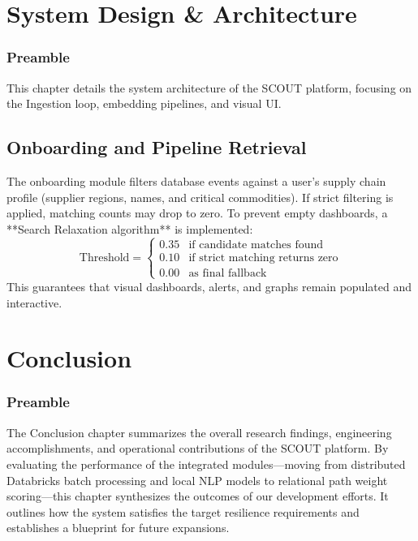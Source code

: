 \documentclass[12pt]{report}
\begin{document}
\newpage
\chapter{System Design \& Architecture}
\thispagestyle{fancy}

\subsection{Preamble}
This chapter details the system architecture of the SCOUT platform, focusing on the Ingestion loop, embedding pipelines, and visual UI.

\section{Onboarding and Pipeline Retrieval}
The onboarding module filters database events against a user's supply chain profile (supplier regions, names, and critical commodities). If strict filtering is applied, matching counts may drop to zero. To prevent empty dashboards, a **Search Relaxation algorithm** is implemented:
\begin{equation}
  \text{Threshold} = 
  \begin{cases} 
    0.35 & \text{if candidate matches found} \\
    0.10 & \text{if strict matching returns zero} \\
    0.00 & \text{as final fallback}
  \end{cases}
\end{equation}
This guarantees that visual dashboards, alerts, and graphs remain populated and interactive.

\newpage
\chapter{Conclusion}
\thispagestyle{fancy}

\subsection{Preamble}
The Conclusion chapter summarizes the overall research findings, engineering accomplishments, and operational contributions of the SCOUT platform. By evaluating the performance of the integrated modules—moving from distributed Databricks batch processing and local NLP models to relational path weight scoring—this chapter synthesizes the outcomes of our development efforts. It outlines how the system satisfies the target resilience requirements and establishes a blueprint for future expansions.
\end{document}
